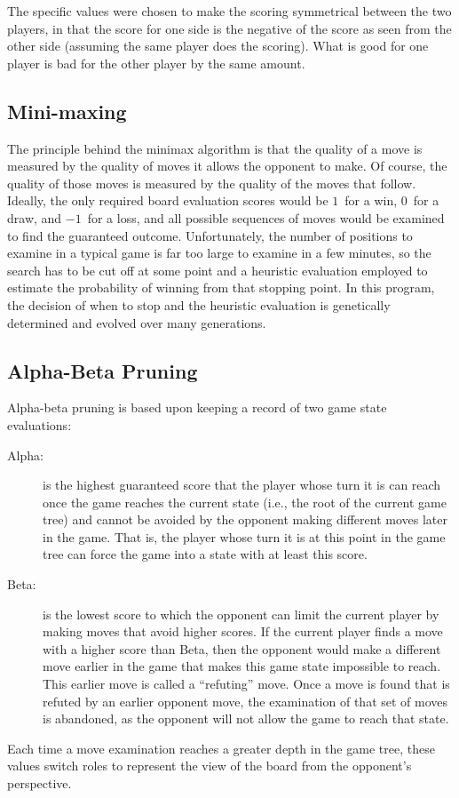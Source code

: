 \documentclass[letterpaper]{article}
\renewcommand{\_}{\allowbreak\textunderscore\allowbreak}
\begin{document}
The specific values were chosen to make the scoring symmetrical between the two players, in that the score for one side is the negative of the score as seen from the other side (assuming the same player does the scoring). What is good for one player is bad for the other player by the same amount.

\subsection{Mini-maxing}

The principle behind the minimax algorithm is that the quality of a move is measured by the quality of moves it allows the opponent to make. Of course, the quality of those moves is measured by the quality of the moves that follow. Ideally, the only required board evaluation scores would be \(1\)~for a win, \(0\)~for a draw, and \(-1\)~for a loss, and all possible sequences of moves would be examined to find the guaranteed outcome. Unfortunately, the number of positions to examine in a typical game is far too large to examine in a few minutes, so the search has to be cut off at some point and a heuristic evaluation employed to estimate the probability of winning from that stopping point. In this program, the decision of when to stop and the heuristic evaluation is genetically determined and evolved over many generations.

\subsection{Alpha-Beta Pruning}

Alpha-beta pruning is based upon keeping a record of two game state evaluations:
\begin{description}
	\item[Alpha:] is the highest guaranteed score that the player whose turn it is can reach once the game reaches the current state (i.e., the root of the current game tree) and cannot be avoided by the opponent making different moves later in the game. That is, the player whose turn it is at this point in the game tree can force the game into a state with at least this score.
	\item[Beta:] is the lowest score to which the opponent can limit the current player by making moves that avoid higher scores. If the current player finds a move with a higher score than Beta, then the opponent would make a different move earlier in the game that makes this game state impossible to reach. This earlier move is called a ``refuting'' move. Once a move is found that is refuted by an earlier opponent move, the examination of that set of moves is abandoned, as the opponent will not allow the game to reach that state.
\end{description}
Each time a move examination reaches a greater depth in the game tree, these values switch roles to represent the view of the board from the opponent's perspective.
\end{document}
